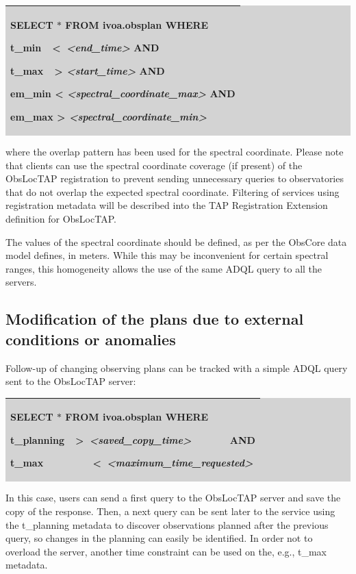 \documentclass[11pt,a4paper]{ivoa}
\begin{document}
\bigskip
\par
\begingroup\setlength{\fboxsep}{0pt}
\colorbox{lightgray}{%
\begin{tabular}{|p{5.53in}|}
\hline
SELECT $\ast$  FROM ivoa.obsplan WHERE  \par  t\_min\ \ <\   \textit{<end\_time>} AND \par  t\_max\ \ >  \textit{<start\_time> } AND \par  em\_min < \textit{<spectral\_coordinate\_max>} AND \par  em\_max > \textit{<spectral\_coordinate\_min>} \\
\hline
\end{tabular}%
}\endgroup
\par
\bigskip
where the overlap pattern has been used for the spectral coordinate. Please note that 
clients can use the spectral coordinate coverage (if present) of the ObsLocTAP registration 
to prevent sending unnecessary queries to observatories that do not overlap the expected 
spectral coordinate. Filtering of services using registration metadata will be described 
into the TAP Registration Extension definition for ObsLocTAP.
\par

The values of the spectral coordinate should be defined, as per the ObsCore data model defines, 
in meters. While this may be inconvenient for certain spectral ranges, this homogeneity 
allows the use of the same ADQL query to all the servers.

\subsection{Modification of the plans due to external conditions or anomalies}
Follow-up of changing observing plans can be tracked with a simple ADQL query sent to the 
ObsLocTAP server:


\bigskip
\par
\begingroup\setlength{\fboxsep}{0pt}
\colorbox{lightgray}{%
\begin{tabular}{|p{5.53in}|}
\hline
SELECT $\ast$  FROM ivoa.obsplan WHERE  \par  t\_planning\ \ >\   \textit{<saved\_copy\_time>}\ \ \ \ \ \ \  AND  \par  t\_max\ \ \ \ \ \ \ \ \ <\   \textit{<maximum\_time\_requested>} \\
\hline
\end{tabular}%
}\endgroup
\par
\bigskip
In this case, users can send a first query to the ObsLocTAP server and save the copy of 
the response. Then, a next query can be sent later to the service using the t\_planning 
metadata to discover observations planned after the previous query, so changes in the 
planning can easily be identified. In order not to overload the server, another time 
constraint can be used on the, e.g., t\_max metadata.
\par
\end{document}
